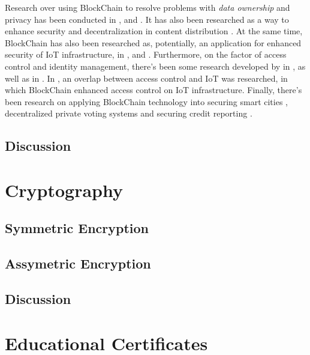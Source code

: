 Research over using BlockChain to resolve problems with \textit{data ownership} and privacy has been conducted in \cite{zyskind_decentralizing_2015}, \cite{liang_provchain:_2017} and \cite{yue_healthcare_2016}. It has also been researched as a way to enhance security and decentralization in content distribution \cite{fotiou_decentralized_2016}. At the same time, BlockChain has also been researched as, potentially, an application for enhanced security of IoT infrastructure, in \cite{dorri_blockchain_2016}, \cite{dorri_blockchain_2017} and \cite{ouaddah_access_2017}. Furthermore, on the factor of access control and identity management, there's been some research developed by \citeauthor{augot_identity_2017} in \cite{augot_identity_2017}, as well as \citeauthor{maesa_blockchain_2017} in \cite{maesa_blockchain_2017}. In \cite{ouaddah_fairaccess:_2017}, an overlap between access control and IoT was researched, in which BlockChain enhanced access control on IoT infrastructure. Finally, there's been research on applying BlockChain technology into securing smart cities \cite{biswas_securing_2016}, decentralized private voting systems \cite{sheer_hardwick_e-voting_2018} and securing credit reporting \cite{kafshdar_goharshady_secure_2018}.

\subsection{Discussion}

\section{Cryptography}

\subsection{Symmetric Encryption}

\subsection{Assymetric Encryption}

\subsection{Discussion}

\section{Educational Certificates}

